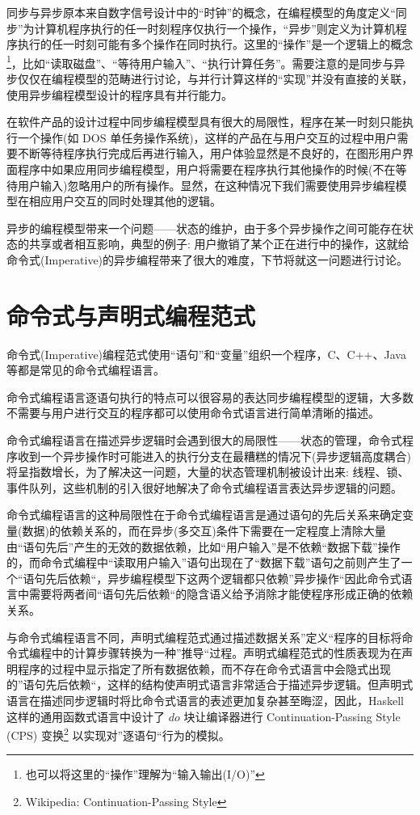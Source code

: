 同步与异步原本来自数字信号设计中的“时钟”的概念，在编程模型的角度定义“同步”为计算机程序执行的任一时刻程序仅执行一个操作，“异步”则定义为计算机程序执行的任一时刻可能有多个操作在同时执行。这里的“操作”是一个逻辑上的概念\footnote{也可以将这里的“操作”理解为“输入输出(I/O)”}，比如“读取磁盘”、“等待用户输入”、“执行计算任务”。需要注意的是同步与异步仅仅在编程模型的范畴进行讨论，与并行计算这样的“实现”并没有直接的关联，使用异步编程模型设计的程序具有并行能力。

在软件产品的设计过程中同步编程模型具有很大的局限性，程序在某一时刻只能执行一个操作(如 DOS 单任务操作系统)，这样的产品在与用户交互的过程中用户需要不断等待程序执行完成后再进行输入，用户体验显然是不良好的，在图形用户界面程序中如果应用同步编程模型，用户将需要在程序执行其他操作的时候(不在等待用户输入)忽略用户的所有操作。显然，在这种情况下我们需要使用异步编程模型在相应用户交互的同时处理其他的逻辑。

异步的编程模型带来一个问题——状态的维护，由于多个异步操作之间可能存在状态的共享或者相互影响，典型的例子: 用户撤销了某个正在进行中的操作，这就给命令式(Imperative)的异步编程带来了很大的难度，下节将就这一问题进行讨论。

\section{命令式与声明式编程范式}

命令式(Imperative)编程范式使用“语句”和“变量”组织一个程序，C、C++、Java 等都是常见的命令式编程语言。

命令式编程语言逐语句执行的特点可以很容易的表达同步编程模型的逻辑，大多数不需要与用户进行交互的程序都可以使用命令式语言进行简单清晰的描述。

命令式编程语言在描述异步逻辑时会遇到很大的局限性——状态的管理，命令式程序收到一个异步操作时可能进入的执行分支在最糟糕的情况下(异步逻辑高度耦合)将呈指数增长，为了解决这一问题，大量的状态管理机制被设计出来: 线程、锁、事件队列，这些机制的引入很好地解决了命令式编程语言表达异步逻辑的问题。

命令式编程语言的这种局限性在于命令式编程语言是通过语句的先后关系来确定变量(数据)的依赖关系的，而在异步(多交互)条件下需要在一定程度上清除大量由“语句先后”产生的无效的数据依赖，比如“用户输入”是不依赖“数据下载”操作的，而命令式编程中“读取用户输入”语句出现在了“数据下载”语句之前则产生了一个“语句先后依赖“，异步编程模型下这两个逻辑都只依赖”异步操作“因此命令式语言中需要将两者间“语句先后依赖“的隐含语义给予消除才能使程序形成正确的依赖关系。

与命令式编程语言不同，声明式编程范式通过描述数据关系”定义“程序的目标将命令式编程中的计算步骤转换为一种”推导“过程。声明式编程范式的性质表现为在声明程序的过程中显示指定了所有数据依赖，而不存在命令式语言中会隐式出现的”语句先后依赖“，这样的结构使声明式语言非常适合于描述异步逻辑。但声明式语言在描述同步逻辑时将比命令式语言的表述更加复杂甚至晦涩，因此，Haskell 这样的通用函数式语言中设计了 $do$ 块让编译器进行 Continuation-Passing Style (CPS) 变换\footnote{Wikipedia: Continuation-Passing Style} 以实现对”逐语句“行为的模拟。

